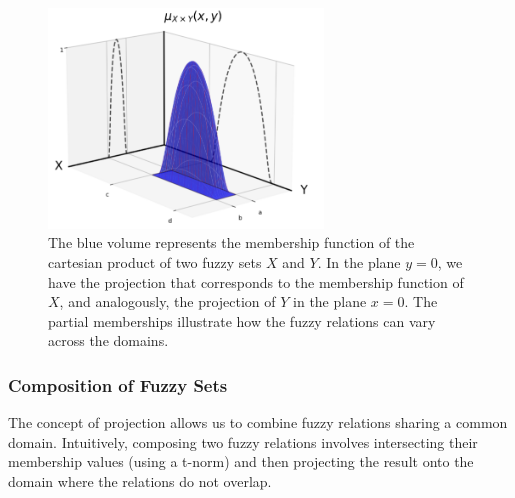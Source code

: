 \begin{figure}[ht]
    \centering
    \includegraphics[width=0.65\textwidth]{ch1/figures/fuzzy_cart_prod.png}
    \caption{The blue volume represents the membership function of the cartesian product of two fuzzy sets $X$ and $Y$. In the plane $y=0$, we have the projection that corresponds to the membership function of $X$, and analogously, the projection of $Y$ in the plane $x=0$. The partial memberships illustrate how the fuzzy relations can vary across the domains.}
    \label{fig:fuzzy_cart_prod}
\end{figure}


\subsubsection*{Composition of Fuzzy Sets}



The concept of projection allows us to combine fuzzy relations sharing a common domain. Intuitively, composing two fuzzy relations involves intersecting their membership values (using a t-norm) and then projecting the result onto the domain where the relations do not overlap.

